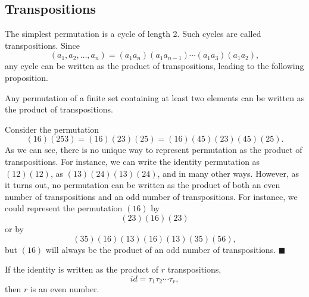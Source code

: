  
\subsection*{Transpositions}
 
 
The simplest permutation is a cycle of length 2. Such
cycles are called  {\bfi transpositions}. Since
$$
(a_1, a_2, \ldots, a_n ) = (a_1 a_n ) (a_1 a_{n-1} ) \cdots ( a_1 a_3 )
(a_1 a_2 ),
$$
any cycle can be written as the product of transpositions, leading to
the following proposition. 
 
 
\begin{proposition}
Any permutation of a finite set containing at least two elements can
be written as the product of transpositions. 
\end{proposition}
 
 
Consider the permutation
$$
( 1 6 ) (2 5 3) = (1 6 )( 2 3 )( 2 5 ) 
= (1 6 )( 4 5 )(2 3 )( 4 5 )(2 5 ).
$$
As we can see, there is no unique way to represent permutation as the
product of transpositions. For instance, we can write the identity 
permutation as $(1 2 )(1 2 )$, as $(1 3 )(2 4 )(1 3 )( 2 4 )$, and in
many other ways. However, as it turns out, no permutation can be
written as the product of both an even number of transpositions and an
odd number of transpositions. For instance, we could represent the
permutation $(1 6)$ by
$$
(2 3 )(1 6)( 2 3)
$$
or by
$$
(3 5) (1 6) (1 3) (1 6) (1 3) (3 5) (5 6),
$$
but $(1 6)$ will always be the product of an odd number of 
transpositions.
\hspace{\fill} $\blacksquare$
 
 
 
\begin{lemma}
If the identity is written as the product of $r$ transpositions,
$$
id = \tau_1 \tau_2 \cdots \tau_r,
$$
then $r$ is an even number.
\end{lemma}
 
